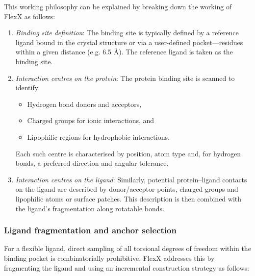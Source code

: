 \documentclass[12pt]{article}
\begin{document}
This working philosophy can be explained by breaking down the working of FlexX as follows:
\begin{enumerate}
  \item \emph{Binding site definition}: The binding site is typically defined by a reference ligand bound in the crystal structure or via a user-defined pocket—residues within a given distance (e.g. 6.5 \r{A}). The reference ligand is taken as the binding site.

  \item \emph{Interaction centres on the protein}: The protein binding site is scanned to identify
        \begin{itemize}
          \item Hydrogen bond donors and acceptors,
          \item Charged groups for ionic interactions, and
          \item Lipophilic regions for hydrophobic interactions.
        \end{itemize}
    Each such centre is characterised by position, atom type and, for hydrogen bonds, a preferred direction and angular tolerance.

  \item \emph{Interaction centres on the ligand}: Similarly, potential protein--ligand contacts on the ligand are described by donor/acceptor points, charged groups and lipophilic atoms or surface patches. This description is then combined with the ligand's fragmentation along rotatable bonds.
\end{enumerate}


\subsubsection{Ligand fragmentation and anchor selection}
For a flexible ligand, direct sampling of all torsional degrees of freedom within the binding pocket is combinatorially prohibitive. FlexX addresses this by fragmenting the ligand and using an incremental construction strategy\cite{CH7_rarey1996} as follows:
\end{document}
